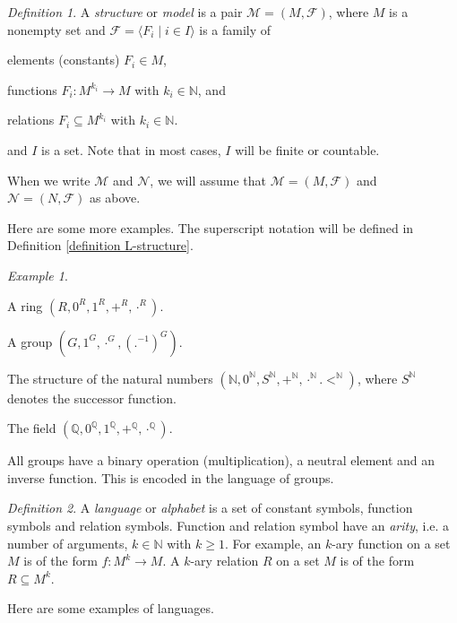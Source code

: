 \documentclass[a4paper, 11pt]{amsart}
\theoremstyle{remark}
\newtheorem{definition}[definition]{Definition}
\newtheorem{example}[example]{Example}
\newcommand{\NN}{\mathbb{N}}
\newcommand{\QQ}{\mathbb{Q}}
\newcommand{\cF}{\mathcal F}
\newcommand{\cM}{\mathcal M}
\newcommand{\cN}{\mathcal N}
\newenvironment{enumerate-(1)}{\begin{enumerate}[label={\upshape (\arabic*)}, leftmargin=2pc]}{\end{enumerate}}
\begin{document}
\begin{definition} 
A \emph{structure} or \emph{model} is a pair $\cM=(M,\cF)$, where $M$ is a nonempty set and $\cF=\langle F_i\mid i\in I\rangle$ is a family of 
\begin{enumerate-(1)} 
\item 
elements (constants) $F_i\in M$,
\item 
functions $F_i\colon M^{k_i}\rightarrow M$ with $k_i\in\NN$, and 
\item 
relations $F_i \subseteq M^{k_i}$ with $k_i\in\NN$. 
\end{enumerate-(1)} 
and $I$ is a set. 
Note that in most cases, $I$ will be finite or countable. 
\end{definition} 

When we write $\cM$ and $\cN$, we will assume that $\cM=(M,\cF)$ and $\cN=(N,\cF)$ as above. 

Here are some more examples. 
The superscript notation will be defined in Definition \ref{definition L-structure}. 

\begin{example} \ 
\begin{enumerate-(1)} 
\item 
A ring $(R,0^R,1^R,+^R,\cdot^R)$. 
\item 
A group $(G,1^G,\cdot^G,(.{}^{-1})^G)$. 
\item 
The structure of the natural numbers $(\NN,0^\NN,S^\NN,+^\NN,\cdot^\NN.<^\NN)$, where $S^\NN$ denotes the successor function. 
\item 
The field $(\QQ,0^\QQ,1^\QQ,+^\QQ,\cdot^\QQ)$. 
\end{enumerate-(1)} 
\end{example} 

All groups have a binary operation (multiplication), a neutral element and an inverse function. This is encoded in the language of groups. 

\begin{definition} 
A \emph{language} or \emph{alphabet} is a set of constant symbols, function symbols and relation symbols. Function and relation symbol have an \emph{arity}, i.e. a number of arguments, $k\in \NN$ with $k\geq 1$. 
For example, an $k$-ary function on a set $M$ is of the form $f\colon M^k\rightarrow M$. 
A $k$-ary relation $R$ on a set $M$ is of the form $R\subseteq M^k$. 
\end{definition} 

Here are some examples of languages. 
\end{document}
